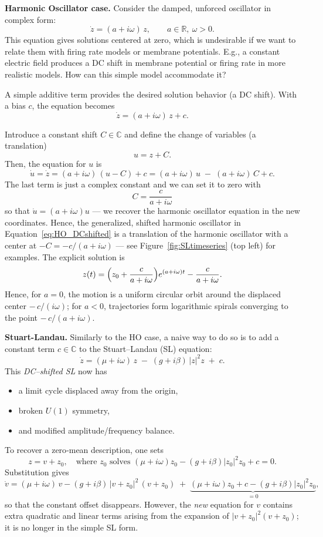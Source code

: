 {\bf Harmonic Oscillator case.} Consider the damped, unforced oscillator in complex form:
\[
\dot z = (a + i\omega)\,z, \qquad a\in\mathbb{R},\ \omega>0.
\]
This equation gives solutions centered at zero, which is undesirable if we want to relate them with firing rate models or membrane potentials. E.g., a constant electric field produces a DC shift in membrane potential or firing rate in more realistic models. How can this simple model accommodate it? 

A simple additive term provides the desired solution behavior (a DC shift).
With a bias $c$, the equation becomes  
\begin{equation}\label{eq:HO_DCshifted}
\dot z = (a + i\omega)\,z +c.
\end{equation}

Introduce a constant shift \(C\in\mathbb{C}\) and define the change of variables (a translation)
\[
u = z + C.
\]
Then, the equation for $u$ is
\[
\dot u = \dot z
        = (a + i\omega)\,(u - C) +c
        = (a + i\omega)\,u \;-\; (a + i\omega)\,C +c.
\]
The last term is just a complex constant and we can set it to zero with
$$
C= \frac{c}{a+i\omega}
$$
so that $\dot u =(a+i\omega) u$  --- we recover the harmonic oscillator equation in the new coordinates. Hence, the generalized, shifted harmonic oscillator in Equation~\ref{eq:HO_DCshifted}
is a translation of the harmonic oscillator with a center at  $-C = -c/(a+i\omega)$ --- see Figure~\ref{fig:SLtimeseries} (top left) for examples. 
The explicit solution is
\[
z(t) = \Bigl(z_0 + \frac{c}{a+i\omega}\Bigr)e^{(a+i\omega)t}
       - \frac{c}{a+i\omega}.
\]
Hence, for \(a=0\), the motion is a uniform circular orbit around 
the displaced center \( -\,c/(i\omega)\); for \(a<0\), trajectories form logarithmic spirals 
converging to the point \( -\,c/(a+i\omega)\). 
 


{\bf Stuart-Landau.}  Similarly to the HO case, a naive way to do so is to add a constant term \(c\in\mathbb{C}\) to the Stuart–Landau (SL) equation:
\[
\dot z = (\mu + i\omega)\,z \;-\;(g + i\beta)\,|z|^2z \;+\; c.
\]
This \emph{DC–shifted SL} now has
\begin{itemize}
  \item a limit cycle displaced away from the origin,
  \item broken $U(1)$ symmetry,
  \item and modified amplitude/frequency balance.
\end{itemize}

\smallskip
  To recover a zero‐mean description, one sets
\[
z = v + z_0,
\quad\text{where }z_0\text{ solves }(\mu + i\omega)z_0 - (g + i\beta)|z_0|^2z_0 + c = 0.
\]
Substitution gives
\[
\dot v
= (\mu + i\omega)\,v
- (g + i\beta)\,\bigl|v + z_0\bigr|^2\,(v + z_0)
\;+\;\underbrace{(\mu + i\omega)z_0 + c - (g + i\beta)|z_0|^2z_0}_{=0},
\]
so that the constant offset disappears.  However, the \emph{new} equation for \(v\) contains extra quadratic and linear terms arising from the expansion of \(\lvert v+z_0\rvert^2(v+z_0)\); it is no longer in the simple SL form.

